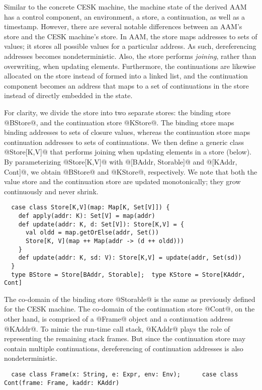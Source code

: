 \documentclass[acmsmall, screen]{acmart}\settopmatter{}
\begin{document}
Similar to the concrete CESK machine, the machine state of the derived AAM has a control component, an environment, a store,
a continuation, as well as a timestamp. However, there are several notable differences
between an AAM's store and the CESK machine's store. In AAM, the store maps addresses to sets of
values; it stores all possible values for a particular address. As such, dereferencing
addresses becomes nondeterministic. Also, the store performs \emph{joining}, rather than
overwriting, when updating elements. Furthermore, the continuations are likewise allocated
on the store instead of formed into a linked list, and the continuation component becomes
an address that maps to a set of continuations in the store instead of directly embedded
in the state.

For clarity, we divide the store into two separate stores: the binding store @BStore@, and
the continuation store @KStore@.
The binding store maps binding addresses to sets of closure values, whereas the continuation
store maps continuation addresses to sets of continuations.
We then define a generic class @Store[K,V]@ that performs joining when updating elements
in a store (below). By parameterizing @Store[K,V]@ with @[BAddr, Storable]@ and
@[KAddr, Cont]@, we obtain @BStore@ and @KStore@, respectively.
We note that both the value store and the continuation store are updated monotonically;
they grow continuously and never shrink.

\begin{lstlisting}
  case class Store[K,V](map: Map[K, Set[V]]) {
    def apply(addr: K): Set[V] = map(addr)
    def update(addr: K, d: Set[V]): Store[K,V] = {
      val oldd = map.getOrElse(addr, Set())
      Store[K, V](map ++ Map(addr -> (d ++ oldd)))
    }
    def update(addr: K, sd: V): Store[K,V] = update(addr, Set(sd))
  }
  type BStore = Store[BAddr, Storable];  type KStore = Store[KAddr, Cont]
\end{lstlisting}

The co-domain of the binding store @Storable@ is the same as previously defined for the CESK
machine. The co-domain of the continuation store @Cont@, on the other hand, is comprised of
a @Frame@ object and a continuation address @KAddr@. To mimic the run-time call stack,
@KAddr@ plays the role of representing the remaining stack frames.
But since the continuation store may contain multiple continuations, dereferencing
of continuation addresses is also nondeterministic.

\begin{lstlisting}
  case class Frame(x: String, e: Expr, env: Env);      case class Cont(frame: Frame, kaddr: KAddr)
\end{lstlisting}
\end{document}
